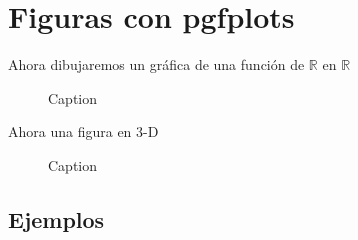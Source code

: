 \section{Figuras con pgfplots}

Ahora dibujaremos un gráfica de una función de $\mathbb{R}$ en $\mathbb{R}$

\begin{figure}[h!]
    \centering
    \caption{Caption}
    \label{fig:enter-label}
\end{figure}

Ahora una figura en $3$-D

\begin{figure}[h!]
    \centering
    \caption{Caption}
    \label{fig:enter-label}
\end{figure}

\subsection{Ejemplos}

